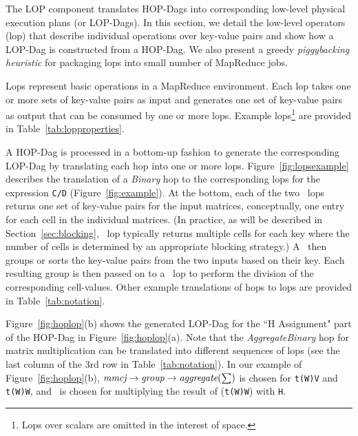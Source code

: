 The LOP component translates HOP-Dags into corresponding low-level physical execution 
plans (or LOP-Dags). In this section, we detail the low-level operators (lop) that 
describe individual operations over key-value pairs and show how a LOP-Dag is constructed 
from a HOP-Dag. We also present a greedy \emph{piggybacking heuristic} for packaging lops 
into small number of MapReduce jobs.

 Lops represent basic operations in a MapReduce environment. Each lop takes one or more sets of key-value pairs as
input and generates one set of key-value pairs as output that can be consumed by one or more lops. 
Example lops\footnote{Lops over scalars are omitted in the interest of space.} are provided in Table~\ref{tab:lopproperties}.

 A HOP-Dag is processed in a bottom-up fashion to 
generate the corresponding LOP-Dag by translating each hop into one or more lops.
Figure~\ref{fig:lopsexample} describes the translation of a \textit{Binary} hop to the corresponding
lops for the expression \texttt{C/D} (Figure~\ref{fig:example}). At the bottom, each of the
two \datalop \ lops returns one set of key-value pairs for the input matrices, conceptually, one
entry for each cell in the individual matrices. (In practice, as will be described in
Section~\ref{sec:blocking}, \datalop\ lop typically returns multiple cells for each key where the
number of cells is determined by an appropriate blocking strategy.) A \grplop\ then groups or sorts
the key-value pairs from the two inputs based on their key. Each resulting group is then passed on
to a \binarylop\ lop to perform the division of the corresponding cell-values. Other example
translations of hops to lops are provided in Table~\ref{tab:notation}.

Figure~\ref{fig:hoplop}(b) shows the generated LOP-Dag for the ``H Assignment" part of the 
HOP-Dag in Figure~\ref{fig:hoplop}(a). Note that the \textit{AggregateBinary} hop for 
matrix multiplication can be translated into different sequences of lops (see the last 
column of the 3rd row in Table~\ref{tab:notation}). In our example of 
Figure~\ref{fig:hoplop}(b), $\textit{mmcj} \rightarrow \textit{group} \rightarrow \textit{aggregate}(\sum)$ is 
chosen for \texttt{t(W)\mmult V} and \texttt{t(W)\mmult W},  
and \rmmlop\ is chosen for multiplying the result of (\texttt{t(W)\mmult W}) with \texttt{H}.

